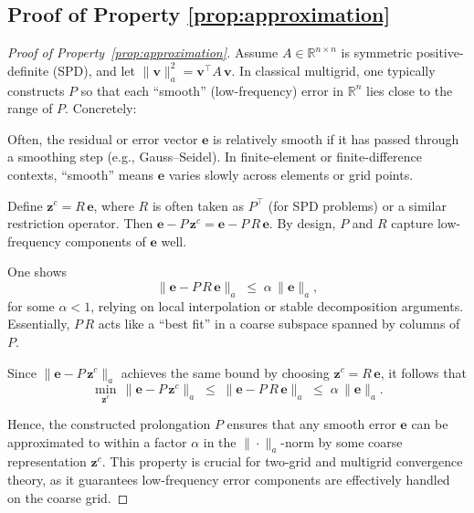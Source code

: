 \subsection{Proof of Property \ref{prop:approximation}} \label{appendix:proof_1}
\begin{proof}[Proof of Property~\ref{prop:approximation}]
Assume \(A\in \mathbb{R}^{n\times n}\) is symmetric positive-definite (SPD), and let \(\|\mathbf{v}\|_{a}^2 = \mathbf{v}^\top A\,\mathbf{v}\). In classical multigrid, one typically constructs \(P\) so that each “smooth” (low-frequency) error in \(\mathbb{R}^n\) lies close to the range of \(P\). Concretely:

Often, the residual or error vector \(\mathbf{e}\) is relatively smooth if it has passed through a smoothing step (e.g., Gauss–Seidel). In finite-element or finite-difference contexts, “smooth” means \(\mathbf{e}\) varies slowly across elements or grid points.

Define \(\mathbf{z}^c = R\,\mathbf{e}\), where \(R\) is often taken as \(P^\top\) (for SPD problems) or a similar restriction operator. Then \(\mathbf{e} - P\,\mathbf{z}^c = \mathbf{e} - P\,R\,\mathbf{e}\). By design, \(P\) and \(R\) capture low-frequency components of \(\mathbf{e}\) well.

One shows
\[
    \|\mathbf{e} - P\,R\,\mathbf{e}\|_{a}
    \;\le\;
    \alpha\,\|\mathbf{e}\|_{a},
\]
for some \(\alpha < 1\), relying on local interpolation or stable decomposition arguments. Essentially, \(P\,R\) acts like a “best fit” in a coarse subspace spanned by columns of \(P\).


Since \(\|\mathbf{e} - P\,\mathbf{z}^c\|_{a}\) achieves the same bound by choosing \(\mathbf{z}^c = R\,\mathbf{e}\), it follows that
\[
    \min_{\mathbf{z}^c}\,\|\mathbf{e} - P\,\mathbf{z}^c\|_{a}
    \;\le\;
    \|\mathbf{e} - P\,R\,\mathbf{e}\|_{a}
    \;\le\;
    \alpha\,\|\mathbf{e}\|_{a}.
\]

Hence, the constructed prolongation \(P\) ensures that any smooth error \(\mathbf{e}\) can be approximated to within a factor \(\alpha\) in the \(\|\cdot\|_{a}\)-norm by some coarse representation \(\mathbf{z}^c\). This property is crucial for two-grid and multigrid convergence theory, as it guarantees low-frequency error components are effectively handled on the coarse grid.
\end{proof}
